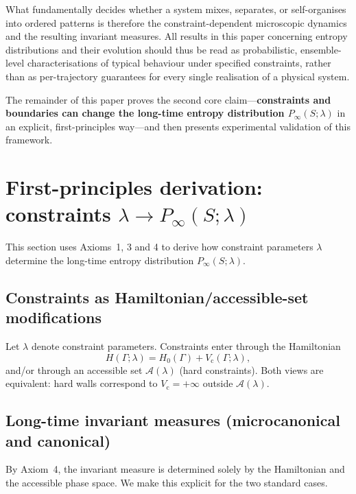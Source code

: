 \documentclass[11pt,a4paper]{article}
\begin{document}
What fundamentally decides whether a system mixes, separates, or self-organises
into ordered patterns is therefore the constraint-dependent microscopic dynamics
and the resulting invariant measures. All results in this paper concerning entropy
distributions and their evolution should thus be read as probabilistic,
ensemble-level characterisations of typical behaviour under specified constraints,
rather than as per-trajectory guarantees for every single realisation of a physical
system.

The remainder of this paper proves the second core claim---\textbf{constraints and
boundaries can change the long-time entropy distribution
$P_{\infty}(S;\lambda)$} in an explicit, first-principles way---and then presents
experimental validation of this framework.

\section{First-principles derivation: constraints $\lambda \to P_{\infty}(S;\lambda)$}
\label{sec:constraint_to_P}

This section uses Axioms~1, 3 and 4 to derive how constraint parameters
$\lambda$ determine the long-time entropy distribution $P_{\infty}(S;\lambda)$.

\subsection{Constraints as Hamiltonian/accessible-set modifications}

Let $\lambda$ denote constraint parameters. Constraints enter through the Hamiltonian
\begin{equation}
H(\Gamma;\lambda)=H_0(\Gamma)+V_{\mathrm{c}}(\Gamma;\lambda),
\label{eq:H_constraint}
\end{equation}
and/or through an accessible set $\mathcal{A}(\lambda)$ (hard constraints). Both
views are equivalent: hard walls correspond to $V_{\mathrm{c}}=+\infty$ outside
$\mathcal{A}(\lambda)$.

\subsection{Long-time invariant measures (microcanonical and canonical)}

By Axiom~4, the invariant measure is determined solely by the Hamiltonian and
the accessible phase space. We make this explicit for the two standard cases.
\end{document}
